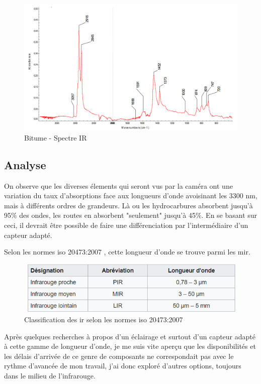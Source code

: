 \begin{figure}[H]
    \centering
    \includegraphics[width=13cm]{assets/figures/bitumeIR.png}
    \caption{Bitume - Spectre IR \cite{Bitume}}
\end{figure}

\subsection{Analyse}
On observe que les diverses élements qui seront vus par la caméra ont une variation du taux d'absorptions face aux longueurs d'onde avoisinant les
3300 \si{\nano\metre}, mais à différents ordres de grandeurs. Là ou les hydrocarbures absorbent jusqu'à 95\% des ondes, les routes en absorbent "seulement" jusqu'à 45\%.
En se basant sur ceci, il devrait être possible de faire une différenciation par l'intermédiaire d'un capteur adapté.


Selon les normes \Gls{iso} 20473:2007 \cite{ISO}, cette longueur d'onde se trouve parmi les \Gls{mir}.
\begin{figure}[H]
    \centering
    \includegraphics[width=13cm]{assets/figures/gamme_infra.png}
    \caption{Classification des \Gls{ir} selon les normes \Gls{iso} 20473:2007 \cite{ISO}}
\end{figure}

Après quelques recherches à propos d'un éclairage et surtout d'un capteur adapté à cette gamme de longueur d'onde, je me suis vite aperçu
que les disponibilités et les délais d'arrivée de ce genre de composants ne correspondait pas avec le rythme d'avancée de mon travail,
j'ai donc exploré d'autres options, toujours dans le milieu de l'infrarouge.

